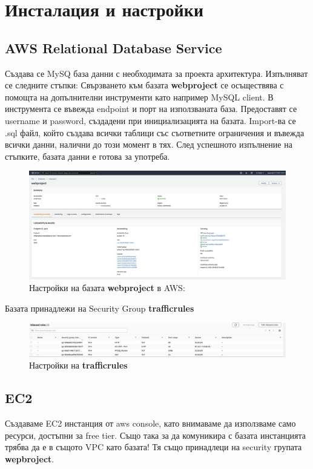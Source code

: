 \documentclass[12pt]{article}
\begin{document}

\section{Инсталация и настройки}
\subsection{AWS Relational Database Service}
Създава се MySQ база данни с необходимата за проекта архитектура. Изпълняват се следните стъпки:
Свързването към базата \textbf{webproject} се осъществява с помощта на допълнителни инструменти като например MySQL client. В инструмента се въвежда endpoint и порт на използваната база. Предоставят се username и password, създадени при инициализацията на базата. Import-ва се .sql файл, който създава всички таблици със съответните ограничения и въвежда всички данни, налични до този момент в тях. След успешното изпълнение на стъпките, базата данни е готова за употреба.
\begin{figure}[!htb]
    \centering
        \includegraphics[scale=0.15]{81908_fig1.png}
    \caption{Настройки на базата \textbf{webproject} в AWS:}
\end{figure}
    
    \noindent  
    
Базата принадлежи на Security Group \textbf{trafficrules} 
\bigskip
\begin{figure}
\centering
        \includegraphics[scale=0.21]{81908_fig2.png}
        \caption{Настройки на \textbf{trafficrules}}
\end{figure}
\subsection{EC2}
Създаваме EC2 инстанция от aws console, като внимаваме да използваме само ресурси, достъпни за free tier. Също така за да комуникира с базата инстанцията трябва да е в същото VPC като базата! Тя също принадлеци на security групата \textbf{wepbroject}.
\end{document}
